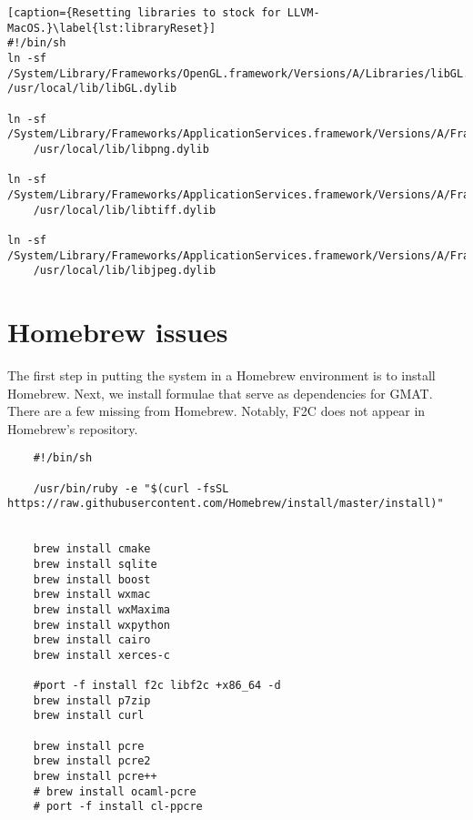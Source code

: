 \documentclass[
  a4paper, %
  11pt, %
  twoside,    %
  onecolumn,  %
  openright,  %
]{memoir}
\begin{document}
\begin{tiny}

	\begin{lstlisting}[caption={Resetting libraries to stock for LLVM-MacOS.}\label{lst:libraryReset}]
#!/bin/sh
ln -sf /System/Library/Frameworks/OpenGL.framework/Versions/A/Libraries/libGL.dylib /usr/local/lib/libGL.dylib

ln -sf 
/System/Library/Frameworks/ApplicationServices.framework/Versions/A/Frameworks/ImageIO.framework/Versions/A/Resources/libPng.dylib 
	/usr/local/lib/libpng.dylib

ln -sf
/System/Library/Frameworks/ApplicationServices.framework/Versions/A/Frameworks/ImageIO.framework/Versions/A/Resources/libTIFF.dylib
	/usr/local/lib/libtiff.dylib

ln -sf /System/Library/Frameworks/ApplicationServices.framework/Versions/A/Frameworks/ImageIO.framework/Versions/A/Resources/libJPEG.dylib 
	/usr/local/lib/libjpeg.dylib
	\end{lstlisting}
\end{tiny}


\section{Homebrew issues} %
\label{sec:homebrew_issues}

The first step in putting the system in a Homebrew environment is to install Homebrew.  Next, we install formulae that serve as dependencies for GMAT.  There are a few missing from Homebrew.  Notably, F2C does not appear in Homebrew's repository.

\begin{lstlisting}
	#!/bin/sh

	/usr/bin/ruby -e "$(curl -fsSL https://raw.githubusercontent.com/Homebrew/install/master/install)"


	brew install cmake
	brew install sqlite
	brew install boost
	brew install wxmac
	brew install wxMaxima 
	brew install wxpython
	brew install cairo
	brew install xerces-c

	#port -f install f2c libf2c +x86_64 -d
	brew install p7zip
	brew install curl 

	brew install pcre
	brew install pcre2
	brew install pcre++
	# brew install ocaml-pcre
	# port -f install cl-ppcre
	
\end{lstlisting}
\end{document}
